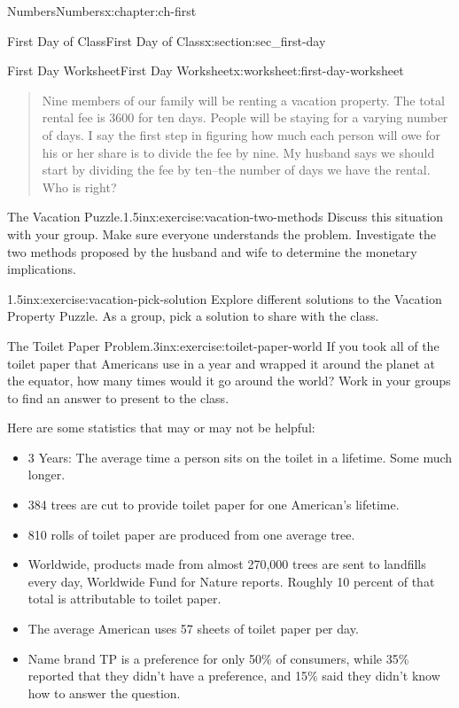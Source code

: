\documentclass[twoside,10pt,]{book}
\numberwithin{equation}{chapter}
\begin{document}
\begin{chapterptx}{Numbers}{}{Numbers}{}{}{x:chapter:ch-first}
\begin{sectionptx}{First Day of Class}{}{First Day of Class}{}{}{x:section:sec_first-day}
\begin{worksheet-subsection}{First Day Worksheet}{}{First Day Worksheet}{}{}{x:worksheet:first-day-worksheet}
\begin{quote}%
Nine members of our family will be renting a vacation property. The total rental fee is \textdollar{}3600 for ten days. People will be staying for a varying number of days. I say the first step in figuring how much each person will owe for his or her share is to divide the fee by nine. My husband says we should start by dividing the fee by ten–the number of days we have the rental. Who is right?\end{quote}
\begin{divisionexercise}{9}{The Vacation Puzzle.}{1.5in}{x:exercise:vacation-two-methods}%
Discuss this situation with your group.  Make sure everyone understands the problem.  Investigate the two methods proposed by the husband and wife to determine the monetary implications.\end{divisionexercise}%
\begin{divisionexercise}{10}{}{1.5in}{x:exercise:vacation-pick-solution}%
Explore different solutions to the Vacation Property Puzzle.  As a group, pick a solution to share with the class.\end{divisionexercise}%
\clearpage
\begin{divisionexercise}{11}{The Toilet Paper Problem.}{3in}{x:exercise:toilet-paper-world}%
If you took all of the toilet paper that Americans use in a year and wrapped it around the planet at the equator, how many times would it go around the world?  Work in your groups to find an answer to present to the class. %
\par
Here are some statistics that may or may not be helpful:%
%
\begin{itemize}[label=\textbullet]
\item{}3 Years: The average time a person sits on the toilet in a lifetime. Some much longer.%
\item{}384 trees are cut to provide toilet paper for one American's lifetime.%
\item{}810 rolls of toilet paper are produced from one average tree.%
\item{}Worldwide, products made from almost 270,000 trees are sent to landfills every day, Worldwide Fund for Nature reports. Roughly 10 percent of that total is attributable to toilet paper.%
\item{}The average American uses 57 sheets of toilet paper per day.%
\item{}Name brand TP is a preference for only 50\% of consumers, while 35\% reported that they didn't have a preference, and 15\% said they didn't know how to answer the question.%

\end{itemize}
\end{divisionexercise}
\end{worksheet-subsection}
\end{sectionptx}
\end{chapterptx}
\end{document}
